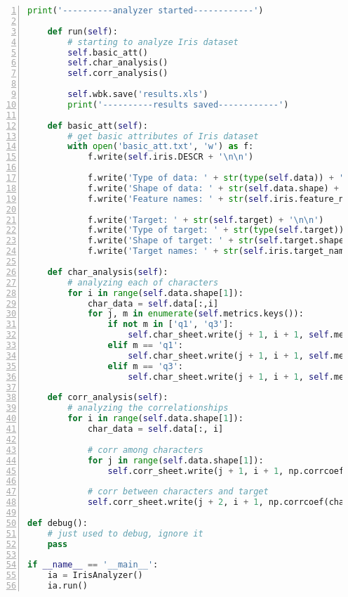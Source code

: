 \documentclass[12pt,a4paper]{article}
\theoremstyle{definition}
\begin{document}
\begin{appendix}
\begin{lstlisting}[language=Python,
		numbers=left,
		keywordstyle=\color{blue!70},
		commentstyle=\color{green!99!blue!99},
		frame=shadowbox,
		breaklines=True,
		title=Iris数据集探索代码]
        print('----------analyzer started------------')

    def run(self):
        # starting to analyze Iris dataset
        self.basic_att()
        self.char_analysis()
        self.corr_analysis()

        self.wbk.save('results.xls')
        print('----------results saved------------')

    def basic_att(self):
        # get basic attributes of Iris dataset
        with open('basic_att.txt', 'w') as f:
            f.write(self.iris.DESCR + '\n\n')

            f.write('Type of data: ' + str(type(self.data)) + '\n\n')
            f.write('Shape of data: ' + str(self.data.shape) + '\n\n')
            f.write('Feature names: ' + str(self.iris.feature_names) + '\n\n')

            f.write('Target: ' + str(self.target) + '\n\n')
            f.write('Type of target: ' + str(type(self.target)) + '\n\n')
            f.write('Shape of target: ' + str(self.target.shape) + '\n\n')
            f.write('Target names: ' + str(self.iris.target_names) + '\n\n')

    def char_analysis(self):
        # analyzing each of characters
        for i in range(self.data.shape[1]):
            char_data = self.data[:,i]
            for j, m in enumerate(self.metrics.keys()):
                if not m in ['q1', 'q3']:
                    self.char_sheet.write(j + 1, i + 1, self.metrics[m](char_data))
                elif m == 'q1':
                    self.char_sheet.write(j + 1, i + 1, self.metrics[m](char_data, p=0.25))
                elif m == 'q3':
                    self.char_sheet.write(j + 1, i + 1, self.metrics[m](char_data, p=0.75))

    def corr_analysis(self):
        # analyzing the correlationships
        for i in range(self.data.shape[1]):
            char_data = self.data[:, i]

            # corr among characters
            for j in range(self.data.shape[1]):
                self.corr_sheet.write(j + 1, i + 1, np.corrcoef(char_data, self.data[:, j])[0][1])

            # corr between characters and target
            self.corr_sheet.write(j + 2, i + 1, np.corrcoef(char_data, self.target)[0][1])

def debug():
    # just used to debug, ignore it
    pass

if __name__ == '__main__':
    ia = IrisAnalyzer()
    ia.run()
		\end{lstlisting}
	
\end{appendix}

\end{document}
